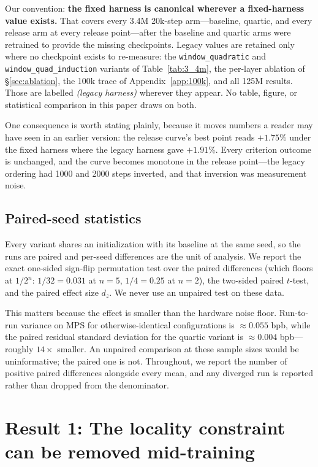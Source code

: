 \documentclass[11pt,a4paper]{article}
\begin{document}
Our convention: \textbf{the fixed harness is canonical wherever a fixed-harness value exists.} That covers every 3.4M 20k-step arm---baseline, quartic, and every release arm at every release point---after the baseline and quartic arms were retrained to provide the missing checkpoints. Legacy values are retained only where no checkpoint exists to re-measure: the \texttt{window\_quadratic} and \texttt{window\_quad\_induction} variants of Table~\ref{tab:3_4m}, the per-layer ablation of \S\ref{sec:ablation}, the 100k trace of Appendix~\ref{app:100k}, and all 125M results. Those are labelled \emph{(legacy harness)} wherever they appear. No table, figure, or statistical comparison in this paper draws on both.

One consequence is worth stating plainly, because it moves numbers a reader may have seen in an earlier version: the release curve's best point reads $+1.75$\% under the fixed harness where the legacy harness gave $+1.91$\%. Every criterion outcome is unchanged, and the curve becomes monotone in the release point---the legacy ordering had 1000 and 2000 steps inverted, and that inversion was measurement noise.

\subsection{Paired-seed statistics}
\label{sec:stats}

Every variant shares an initialization with its baseline at the same seed, so the runs are paired and per-seed differences are the unit of analysis. We report the exact one-sided sign-flip permutation test over the paired differences (which floors at $1/2^n$: $1/32 = 0.031$ at $n=5$, $1/4 = 0.25$ at $n=2$), the two-sided paired $t$-test, and the paired effect size $d_z$. We never use an unpaired test on these data.

This matters because the effect is smaller than the hardware noise floor. Run-to-run variance on MPS for otherwise-identical configurations is ${\approx}0.055$ bpb, while the paired residual standard deviation for the quartic variant is ${\approx}0.004$ bpb---roughly $14\times$ smaller. An unpaired comparison at these sample sizes would be uninformative; the paired one is not. Throughout, we report the number of positive paired differences alongside every mean, and any diverged run is reported rather than dropped from the denominator.

\section{Result 1: The locality constraint can be removed mid-training}
\label{sec:removal}
\end{document}
